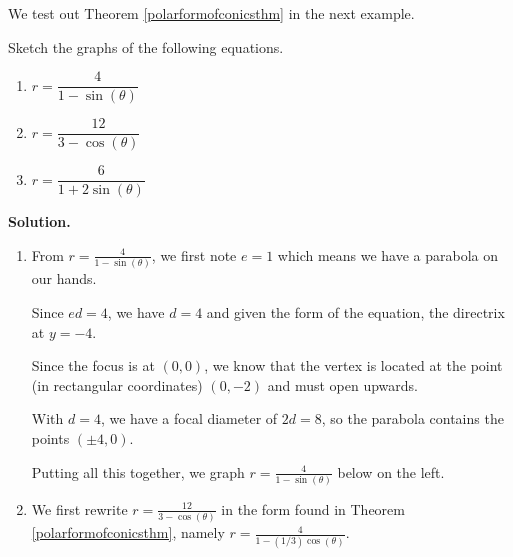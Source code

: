 \documentclass{ximera}
\begin{document}
{\begin{theorem}
\begin{itemize}
\end{itemize} 

\smallskip

\end{theorem}


\smallskip

We test out Theorem \ref{polarformofconicsthm} in the next example.

\smallskip

\begin{example}  \label{polarconicgraphex}  Sketch the graphs of the following equations.


\begin{multicols}{3}
\begin{enumerate}

\item  \label{polarparabola} $r  = \dfrac{4}{1-\sin(\theta)}$

\item  $r = \dfrac{12}{3 - \cos(\theta)}$  

\item  $r = \dfrac{6}{1 + 2\sin(\theta)}$


\end{enumerate}
\end{multicols}



{\bf Solution.}  \begin{enumerate}  \item From $r  = \frac{4}{1-\sin(\theta)}$, we first note $e =1$ which means we have a parabola on our hands.  

\smallskip

Since $ed = 4$, we have $d=4$ and given the form of the equation, the directrix at $y = -4$.  

\smallskip

Since the focus is at $(0,0)$, we know that the vertex is located at the point (in rectangular coordinates) $(0,-2)$ and must open upwards.  

\smallskip

With $d=4$, we have a focal diameter of $2d = 8$, so the parabola contains the points $(\pm 4, 0)$.  

\smallskip

Putting all this together, we graph  $r  = \frac{4}{1-\sin(\theta)}$ below on the left.


\item  We first rewrite $r = \frac{12}{3 - \cos(\theta)}$ in the form found in Theorem \ref{polarformofconicsthm}, namely $r = \frac{4}{1 - (1/3) \cos(\theta)}$.  


\end{enumerate}
\end{example}}
\end{document}
